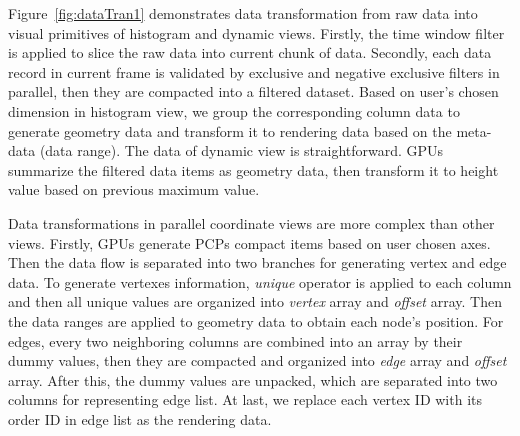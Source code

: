 Figure~\ref{fig:dataTran1} demonstrates data transformation from raw data into visual primitives of histogram and dynamic views. Firstly, the time window filter is applied to slice the raw data into current chunk of data. Secondly, each data record in current frame is validated by exclusive and negative exclusive filters in parallel, then they are compacted into a filtered dataset. Based on user's chosen dimension in histogram view, we group the corresponding column data to generate geometry data and transform it to rendering data based on the meta-data (data range). The data of dynamic view is straightforward. GPUs summarize the filtered data items as geometry data, then transform it to height value based on previous maximum value.

Data transformations in parallel coordinate views are more complex than other views. Firstly, GPUs generate PCPs compact items based on user chosen axes. Then the data flow is separated into two branches for generating vertex and edge data. To generate vertexes information, \textsl{unique} operator is applied to each column and then all unique values are organized into \textit{vertex} array and \textit{offset} array. Then the data ranges are applied to geometry data to obtain each node's position.
For edges, every two neighboring columns are combined into an array by their dummy values, then they are compacted and organized into \textit{edge} array and \textit{offset} array.  After this, the dummy values are unpacked, which are separated into two columns for representing edge list. At last, we replace  each vertex ID with its order ID in edge list as the rendering data.  



